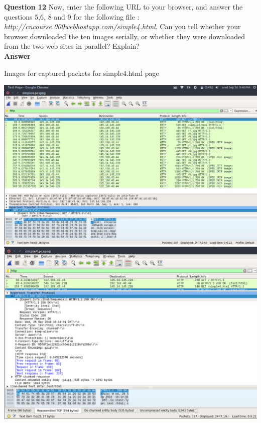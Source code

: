 \documentclass[14pt]{extarticle}
\begin{document}
    \noindent
    \textbf{\large Question 12}
    Now, enter the following URL to your browser, and 
    answer the questions 5,6, 8 and 9 for the following file :
    \textsl{http://cncourse.000webhostapp.com/simple4.html}. Can you tell whether your browser downloaded the ten images serially, or 
    whether they were downloaded from the two web sites in parallel? Explain?\\
    \textbf{\large Answer}
    \begin{center}
        {\large \textmd{Images for captured packets for simple4.html page}}\\
    \end{center}
    \includegraphics[scale=0.40]{1_12}\\[10pt]
    \includegraphics[scale=0.40]{1_12_1}\\[10pt]
\end{document}
